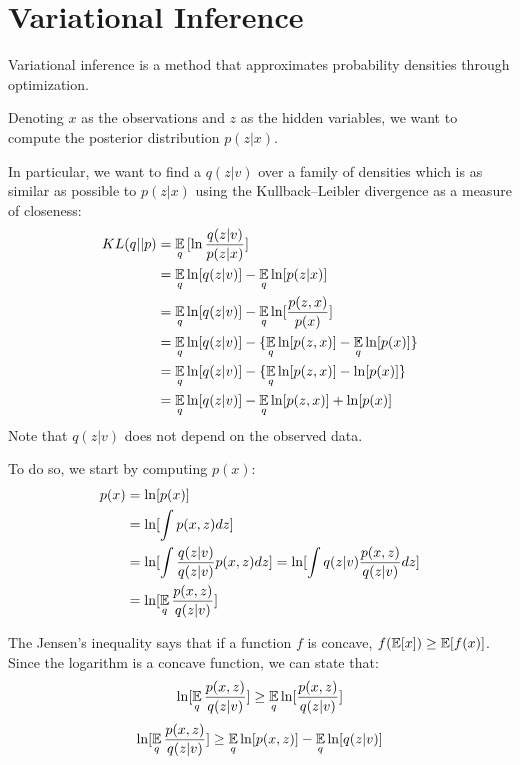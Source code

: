 \chapter{Variational Inference} \label{vi}
Variational inference is a method that approximates probability densities through optimization.

Denoting $x$ as the observations and $z$ as the hidden variables,
we want to compute the posterior distribution $p(z | x)$.

In particular, we want to find a $q(z | v)$ over a family of densities
which is as similar as possible to $p(z | x)$ using the Kullback–Leibler divergence as a measure of closeness:
\begin{equation} \label{eq:klexpanded}
    \begin{split}
        KL(q || p) & = \operatorname*{\mathbb{E}}_q {[\ln \frac{q(z | v)}{p(z | x)}]} \\
        & = \operatorname*{\mathbb{E}}_q \ln [q(z | v)] - \operatorname*{\mathbb{E}}_q \ln [p(z | x)] \\
        & = \operatorname*{\mathbb{E}}_q \ln [q(z | v)] - \operatorname*{\mathbb{E}}_q \ln [\frac{p(z,x)}{p(x)}] \\
        & = \operatorname*{\mathbb{E}}_q \ln [q(z | v)] - \{ \operatorname*{\mathbb{E}}_q \ln [p(z,x)] - \operatorname*{\mathbb{E}}_q \ln [p(x)] \} \\
        & = \operatorname*{\mathbb{E}}_q \ln [q(z | v)] - \{ \operatorname*{\mathbb{E}}_q \ln [p(z,x)] - \ln [p(x)] \} \\
        & = \operatorname*{\mathbb{E}}_q \ln [q(z | v)] - \operatorname*{\mathbb{E}}_q \ln [p(z,x)] + \ln [p(x)]
    \end{split}
\end{equation}
Note that $q(z | v)$ does not depend on the observed data.

To do so, we start by computing $p(x)$:
\begin{equation*}
    \begin{split}
        p(x) & = \ln[p(x)] \\
        & = \ln[\int p(x,z) dz]  \\
        & = \ln[\int \frac{q(z | v)}{q(z | v)} p(x,z) dz] = \ln[\int q(z | v) \frac{p(x,z)}{q(z | v)} dz] \\
        & = \ln[\operatorname*{\mathbb{E}}_q \frac{p(x,z)}{q(z | v)}]
    \end{split}
\end{equation*}

The Jensen's inequality says that if a function $f$ is concave, $f(\operatorname*{\mathbb{E}}[x]) \geq \operatorname*{\mathbb{E}}[f(x)]$.
Since the logarithm is a concave function, we can state that:
$$ \ln[\operatorname*{\mathbb{E}}_q \frac{p(x,z)}{q(z | v)}] \geq \operatorname*{\mathbb{E}}_q \ln[\frac{p(x,z)}{q(z | v)}] $$
$$ \ln[\operatorname*{\mathbb{E}}_q \frac{p(x,z)}{q(z | v)}] \geq \operatorname*{\mathbb{E}}_q \ln[p(x,z)] - \operatorname*{\mathbb{E}}_q \ln[q(z | v)] $$

